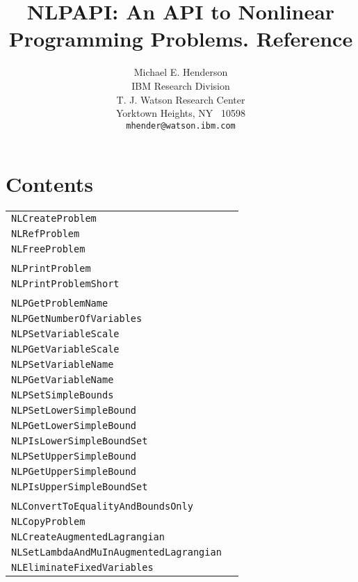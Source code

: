 \documentclass[12pt]{article}
\title{NLPAPI: An API to Nonlinear Programming Problems. {\bf Reference}}
\author{
  Michael E. Henderson\\[.5\baselineskip]
  IBM Research Division\\
  T. J. Watson Research Center\\
  Yorktown Heights, NY ~10598\\
  {\tt mhender@watson.ibm.com}
 }
\begin{document}
  \maketitle

\section{Contents}

\begin{center}
\begin{tabular}{ll}
\tt NLCreateProblem&\pageref{Subroutine:NLCreateProblem}\\
\tt NLRefProblem&\pageref{Subroutine:NLRefProblem}\\
\tt NLFreeProblem&\pageref{Subroutine:NLFreeProblem}\\
\\
\tt NLPrintProblem&\pageref{Subroutine:NLPrintProblem}\\
\tt NLPrintProblemShort&\pageref{Subroutine:NLPrintProblemShort}\\
\\
\tt NLPGetProblemName&\pageref{Subroutine:NLPGetProblemName}\\
\tt NLPGetNumberOfVariables&\pageref{Subroutine:NLPGetNumberOfVariables}\\
\tt NLPSetVariableScale&\pageref{Subroutine:NLPSetVariableScale}\\
\tt NLPGetVariableScale&\pageref{Subroutine:NLPGetVariableScale}\\
\tt NLPSetVariableName&\pageref{Subroutine:NLPSetVariableName}\\
\tt NLPGetVariableName&\pageref{Subroutine:NLPGetVariableName}\\
\tt NLPSetSimpleBounds&\pageref{Subroutine:NLPSetSimpleBounds}\\
\tt NLPSetLowerSimpleBound&\pageref{Subroutine:NLPSetLowerSimpleBound}\\
\tt NLPGetLowerSimpleBound&\pageref{Subroutine:NLPGetLowerSimpleBound}\\
\tt NLPIsLowerSimpleBoundSet&\pageref{Subroutine:NLPIsLowerSimpleBoundSet}\\
\tt NLPSetUpperSimpleBound&\pageref{Subroutine:NLPSetUpperSimpleBound}\\
\tt NLPGetUpperSimpleBound&\pageref{Subroutine:NLPGetUpperSimpleBound}\\
\tt NLPIsUpperSimpleBoundSet&\pageref{Subroutine:NLPIsUpperSimpleBoundSet}\\
\\
\tt NLConvertToEqualityAndBoundsOnly&\pageref{Subroutine:NLConvertToEqualityAndBoundsOnly}\\
\tt NLCopyProblem&\pageref{Subroutine:NLCopyProblem}\\
\tt NLCreateAugmentedLagrangian&\pageref{Subroutine:NLCreateAugmentedLagrangian}\\
\tt NLSetLambdaAndMuInAugmentedLagrangian&\pageref{Subroutine:NLSetLambdaAndMuInAugmentedLagrangian}\\
\tt NLEliminateFixedVariables&\pageref{Subroutine:NLEliminateFixedVariables}\\
\end{tabular}
\end{center}
\newpage
\end{document}
